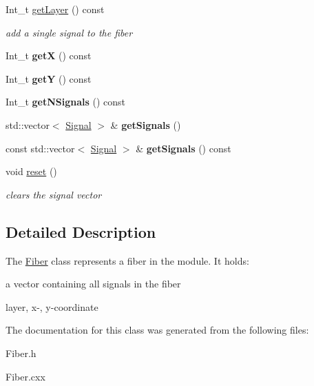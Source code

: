 \begin{DoxyCompactItemize}
Int\+\_\+t \hyperlink{classFiber_a1412d08cdfbf76a52d110638a044008c}{get\+Layer} () const
\begin{DoxyCompactList}\small\item\em add a single signal to the fiber \end{DoxyCompactList}\item 
\mbox{\label{classFiber_a31e5ff8ce35bc757916229333f1e3069}} 
Int\+\_\+t {\bfseries getX} () const
\item 
\mbox{\label{classFiber_a3034fb37567731f7dd2dd7608e558b38}} 
Int\+\_\+t {\bfseries getY} () const
\item 
\mbox{\label{classFiber_abd241473f5ae5b33ccf40ed0f8c0ac41}} 
Int\+\_\+t {\bfseries get\+N\+Signals} () const
\item 
\mbox{\label{classFiber_aaab9524df9c6fb49ec121200328d390f}} 
std\+::vector$<$ \hyperlink{classSignal}{Signal} $>$ \& {\bfseries get\+Signals} ()
\item 
\mbox{\label{classFiber_aee2f6bd8d4fab5f963fc5a4502159479}} 
const std\+::vector$<$ \hyperlink{classSignal}{Signal} $>$ \& {\bfseries get\+Signals} () const
\item 
\mbox{\label{classFiber_acd35d3a60911ef6669c668782503866a}} 
void \hyperlink{classFiber_acd35d3a60911ef6669c668782503866a}{reset} ()
\begin{DoxyCompactList}\small\item\em clears the signal vector \end{DoxyCompactList}\end{DoxyCompactItemize}


\subsection{Detailed Description}
The \hyperlink{classFiber}{Fiber} class represents a fiber in the module. It holds\+:
\begin{DoxyItemize}
\item a vector containing all signals in the fiber
\item layer, x-\/, y-\/coordinate 
\end{DoxyItemize}

The documentation for this class was generated from the following files\+:\begin{DoxyCompactItemize}
\item 
Fiber.\+h\item 
Fiber.\+cxx\end{DoxyCompactItemize}
